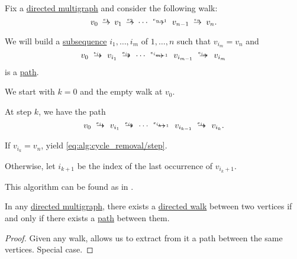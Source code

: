 \begin{algorithm}\label{alg:cycle_removal}
  Fix a \hyperref[def:hypergraph/multigraph]{directed multigraph} and consider the following walk:
  \begin{equation}\label{eq:alg:cycle_removal/src}
    v_0 \reloset {e_1} \to v_1 \reloset {e_2} \to \cdots \reloset {e_{n-1}} \to v_{n-1} \reloset {e_n} \to v_n.
  \end{equation}

  We will build a \hyperref[def:subsequence]{subsequence} \( i_1, \ldots, i_m \) of \( 1, \ldots, n \) such that \( v_{i_m} = v_n \) and
  \begin{equation}\label{eq:alg:cycle_removal/dest}
    v_0 \reloset {e_{i_1}} \to v_{i_1} \reloset {e_{i_2}} \to \cdots \reloset {e_{i_{m-1}}} \to v_{i_{m-1}} \reloset {e_{i_m}} \to v_{i_m}
  \end{equation}
  is a \hyperref[def:graph_walk/path]{path}.

  \begin{thmenum}
     We start with \( k = 0 \) and the empty walk at \( v_0 \).

     At step \( k \), we have the path
    \begin{equation}\label{eq:alg:cycle_removal/step}
      v_0 \reloset {e_{i_1}} \to v_{i_1} \reloset {e_{i_2}} \to \cdots \reloset {e_{i_{k-1}}} \to v_{i_{k-1}} \reloset {e_{i_k}} \to v_{i_k}.
    \end{equation}

    \begin{thmenum}
       If \( v_{i_k} = v_n \), yield \eqref{eq:alg:cycle_removal/step}.

       Otherwise, let \( i_{k+1} \) be the index of the last occurrence of \( v_{i_k + 1} \).
    \end{thmenum}
  \end{thmenum}
\end{algorithm}
\begin{comments}
  \item This algorithm can be found as  in \cite{notebook:code}.
\end{comments}

\begin{proposition}\label{thm:path_iff_walk}
  In any \hyperref[def:hypergraph/multigraph]{directed multigraph}, there exists a \hyperref[def:graph_walk/directed]{directed walk} between two vertices if and only if there exists a \hyperref[def:graph_walk/path]{path} between them.
\end{proposition}
\begin{proof}
  \SufficiencySubProof Given any walk,  allows us to extract from it a path between the same vertices.
  \NecessitySubProof Special case.
\end{proof}

